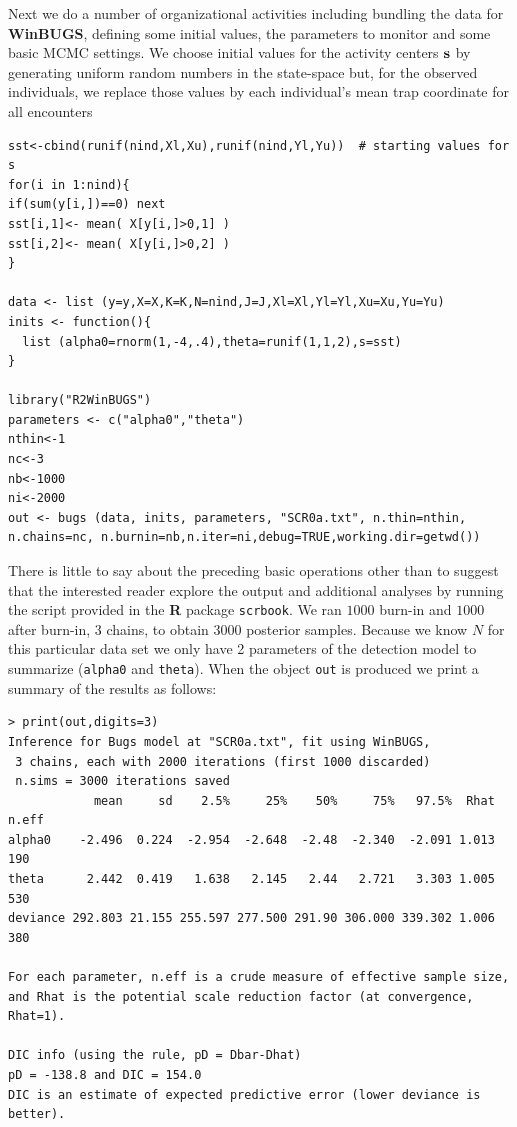 Next we do a number of organizational activities including bundling
the data for {\bf WinBUGS}, defining some initial values, the parameters to
monitor and some basic MCMC settings.  We choose initial values for
the activity centers ${\bf s}$ by generating uniform random numbers in
the state-space but, for the observed individuals, we replace those
values by each individual's mean trap coordinate for all encounters
{\small 
\begin{verbatim}
sst<-cbind(runif(nind,Xl,Xu),runif(nind,Yl,Yu))  # starting values for s
for(i in 1:nind){
if(sum(y[i,])==0) next
sst[i,1]<- mean( X[y[i,]>0,1] )
sst[i,2]<- mean( X[y[i,]>0,2] )
}

data <- list (y=y,X=X,K=K,N=nind,J=J,Xl=Xl,Yl=Yl,Xu=Xu,Yu=Yu)
inits <- function(){
  list (alpha0=rnorm(1,-4,.4),theta=runif(1,1,2),s=sst)
}

library("R2WinBUGS")
parameters <- c("alpha0","theta")
nthin<-1
nc<-3
nb<-1000
ni<-2000
out <- bugs (data, inits, parameters, "SCR0a.txt", n.thin=nthin,
n.chains=nc, n.burnin=nb,n.iter=ni,debug=TRUE,working.dir=getwd())
\end{verbatim}
}
There is little to say about the preceding basic operations other than
to suggest that the interested reader explore the output and
additional analyses by running the script provided in the {\bf R}
package \mbox{\tt scrbook}.
 We ran $1000$ burn-in and $1000$ after burn-in, 3 chains,
to obtain 3000 posterior samples.  Because we know $N$ for this
particular data set we only have 2 parameters of the detection model
to summarize (\mbox{\tt alpha0} and \mbox{\tt theta}).  When the
object \mbox{\tt out} is produced we print a summary of the results as
follows:
{\small
\begin{verbatim}
> print(out,digits=3)
Inference for Bugs model at "SCR0a.txt", fit using WinBUGS,
 3 chains, each with 2000 iterations (first 1000 discarded)
 n.sims = 3000 iterations saved
            mean     sd    2.5%     25%    50%     75%   97.5%  Rhat n.eff
alpha0    -2.496  0.224  -2.954  -2.648  -2.48  -2.340  -2.091 1.013   190
theta      2.442  0.419   1.638   2.145   2.44   2.721   3.303 1.005   530
deviance 292.803 21.155 255.597 277.500 291.90 306.000 339.302 1.006   380

For each parameter, n.eff is a crude measure of effective sample size,
and Rhat is the potential scale reduction factor (at convergence, Rhat=1).

DIC info (using the rule, pD = Dbar-Dhat)
pD = -138.8 and DIC = 154.0
DIC is an estimate of expected predictive error (lower deviance is better).
\end{verbatim}
}

